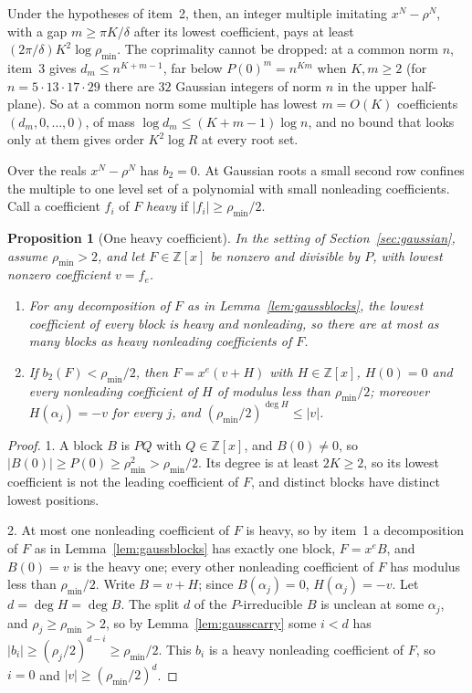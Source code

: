\documentclass[11pt]{article}
\newtheorem{proposition}[theorem]{Proposition}
\begin{document}
Under the hypotheses of item~2, then, an integer multiple imitating $x^N-\rho^N$,
with a gap $m\ge\pi K/\delta$ after its lowest coefficient, pays at least
$(2\pi/\delta)K^2\log\rho_{\min}$.  The coprimality cannot be dropped: at a
common norm $n$, item~3 gives $d_m\le n^{K+m-1}$, far below
$P(0)^m=n^{Km}$ when $K,m\ge2$ (for $n=5\cdot13\cdot17\cdot29$ there are $32$
Gaussian integers of norm $n$ in the upper half-plane).  So at a common norm
some multiple has lowest $m=O(K)$ coefficients $(d_m,0,\ldots,0)$, of mass
$\log d_m\le(K+m-1)\log n$, and no bound that looks only at them gives order
$K^2\log R$ at every root set.

Over the reals $x^N-\rho^N$ has $b_2=0$.  At Gaussian roots a small second
row confines the multiple to one level set of a polynomial with small
nonleading coefficients.  Call a coefficient $f_i$ of $F$ \emph{heavy} if
$|f_i|\ge\rho_{\min}/2$.

\begin{proposition}[One heavy coefficient]\label{prop:gaussheavy}
In the setting of Section~\ref{sec:gaussian}, assume $\rho_{\min}>2$, and let
$F\in\mathbb Z[x]$ be nonzero and divisible by $P$, with lowest nonzero
coefficient $v=f_e$.
\begin{enumerate}
\item For any decomposition of $F$ as in Lemma~\ref{lem:gaussblocks}, the
lowest coefficient of every block is heavy and nonleading, so there are at most
as many blocks as heavy nonleading coefficients of $F$.
\item If $b_2(F)<\rho_{\min}/2$, then $F=x^e(v+H)$ with $H\in\mathbb Z[x]$,
$H(0)=0$ and every nonleading coefficient of $H$ of modulus less than
$\rho_{\min}/2$; moreover $H(\alpha_j)=-v$ for every $j$, and
$(\rho_{\min}/2)^{\deg H}\le|v|$.
\end{enumerate}
\end{proposition}

\begin{proof}
1.  A block $B$ is $PQ$ with $Q\in\mathbb Z[x]$, and $B(0)\ne0$, so
$|B(0)|\ge P(0)\ge\rho_{\min}^2>\rho_{\min}/2$.  Its degree is at least $2K\ge2$,
so its lowest coefficient is not the leading coefficient of $F$, and distinct
blocks have distinct lowest positions.

2.  At most one nonleading coefficient of $F$ is heavy, so by item~1 a
decomposition of $F$ as in Lemma~\ref{lem:gaussblocks} has exactly one block,
$F=x^eB$, and $B(0)=v$ is the heavy one; every other
nonleading coefficient of $F$ has modulus less than $\rho_{\min}/2$.  Write
$B=v+H$; since $B(\alpha_j)=0$, $H(\alpha_j)=-v$.  Let
$d=\deg H=\deg B$.  The split $d$ of the $P$-irreducible $B$ is unclean at
some $\alpha_j$, and $\rho_j\ge\rho_{\min}>2$, so by
Lemma~\ref{lem:gausscarry} some $i<d$ has
$|b_i|\ge(\rho_j/2)^{d-i}\ge\rho_{\min}/2$.  This $b_i$ is a heavy
nonleading coefficient of $F$, so $i=0$ and $|v|\ge(\rho_{\min}/2)^d$.
\end{proof}
\end{document}
